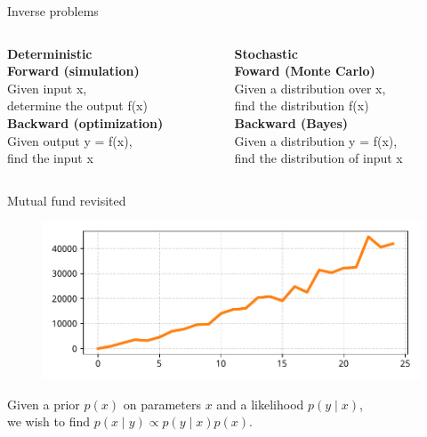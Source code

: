 \documentclass[12pt, aspectratio=149]{beamer}
\theoremstyle{plain}
\begin{document}
\begin{frame}[fragile]{Inverse problems}
\begin{columns}
\begin{column}{0.5\textwidth}
    \begin{center}
\textbf{Deterministic}\\
\vspace*{2em}
\textbf{Forward (simulation)} \\
Given input x,\\determine the output f(x) \\
\vspace*{1em}
\textbf{Backward (optimization)} \\
Given output y = f(x),\\find the input x
     \end{center}
\end{column}
\begin{column}{0.5\textwidth}  %
    \begin{center}
\textbf{Stochastic}\\
\vspace*{2em}
\textbf{Foward (Monte Carlo)} \\
Given a distribution over x,\\find the distribution f(x) \\
\vspace*{1em}
\textbf{Backward (Bayes)} \\
Given a distribution y = f(x),\\find the distribution of input x
     \end{center}
\end{column}
\end{columns}
\end{frame}


\begin{frame}[fragile]{Mutual fund revisited}
\vspace*{-1em}
\begin{center}
 \begin{figure}
    	\centering
    	\includegraphics[width=0.9\linewidth]{figures/esmda_observations.pdf}
 \end{figure}
 Given a prior $p(x)$ on parameters $x$ and a likelihood $p(y \mid x)$, \\
 we wish to find $p(x \mid y) \propto p(y \mid x) p(x)$.
 \end{center}
\end{frame}
\end{document}
